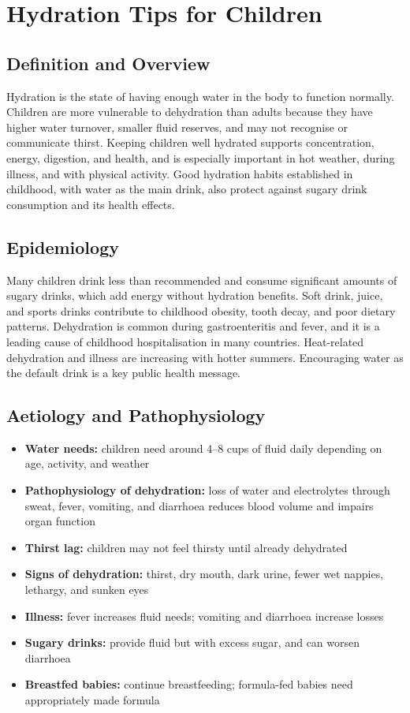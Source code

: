\chapter{Hydration Tips for Children}

\section*{Definition and Overview}
Hydration is the state of having enough water in the body to function normally. Children are more vulnerable to dehydration than adults because they have higher water turnover, smaller fluid reserves, and may not recognise or communicate thirst. Keeping children well hydrated supports concentration, energy, digestion, and health, and is especially important in hot weather, during illness, and with physical activity. Good hydration habits established in childhood, with water as the main drink, also protect against sugary drink consumption and its health effects.

\section*{Epidemiology}
Many children drink less than recommended and consume significant amounts of sugary drinks, which add energy without hydration benefits. Soft drink, juice, and sports drinks contribute to childhood obesity, tooth decay, and poor dietary patterns. Dehydration is common during gastroenteritis and fever, and it is a leading cause of childhood hospitalisation in many countries. Heat-related dehydration and illness are increasing with hotter summers. Encouraging water as the default drink is a key public health message.

\section*{Aetiology and Pathophysiology}
\begin{itemize}
    \item \textbf{Water needs:} children need around 4--8 cups of fluid daily depending on age, activity, and weather
    \item \textbf{Pathophysiology of dehydration:} loss of water and electrolytes through sweat, fever, vomiting, and diarrhoea reduces blood volume and impairs organ function
    \item \textbf{Thirst lag:} children may not feel thirsty until already dehydrated
    \item \textbf{Signs of dehydration:} thirst, dry mouth, dark urine, fewer wet nappies, lethargy, and sunken eyes
    \item \textbf{Illness:} fever increases fluid needs; vomiting and diarrhoea increase losses
    \item \textbf{Sugary drinks:} provide fluid but with excess sugar, and can worsen diarrhoea
    \item \textbf{Breastfed babies:} continue breastfeeding; formula-fed babies need appropriately made formula
\end{itemize}

